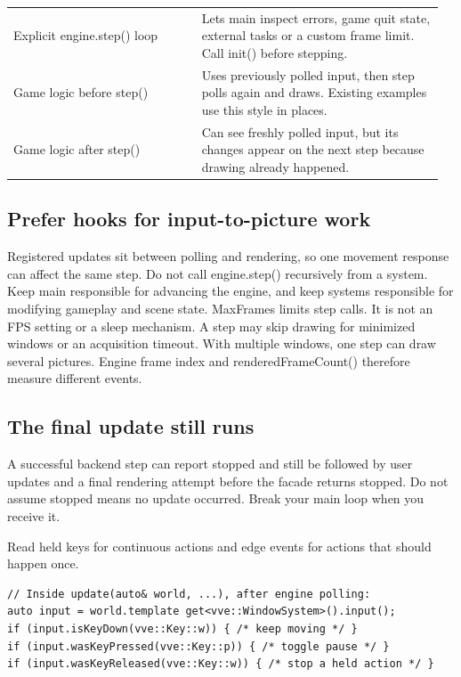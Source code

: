 \documentclass[11pt,a4paper]{article}
\begin{document}
{\small
\begin{longtable}{@{}p{0.42\linewidth}p{0.54\linewidth}@{}}
Explicit engine.step() loop & Lets main inspect errors, game quit state, external tasks or a custom frame limit. Call init() before stepping. \\
Game logic before step() & Uses previously polled input, then step polls again and draws. Existing examples use this style in places. \\
Game logic after step() & Can see freshly polled input, but its changes appear on the next step because drawing already happened. \\
\end{longtable}
}

\subsection*{Prefer hooks for input-to-picture work}
Registered updates sit between polling and rendering, so one movement response can affect the same step. Do not call engine.step() recursively from a system. Keep main responsible for advancing the engine, and keep systems responsible for modifying gameplay and scene state. MaxFrames limits step calls. It is not an FPS setting or a sleep mechanism. A step may skip drawing for minimized windows or an acquisition timeout. With multiple windows, one step can draw several pictures. Engine frame index and renderedFrameCount() therefore measure different events.

\subsection*{The final update still runs}
A successful backend step can report stopped and still be followed by user updates and a final rendering attempt before the facade returns stopped. Do not assume stopped means no update occurred. Break your main loop when you receive it.

\label{core-58}
Read held keys for continuous actions and edge events for actions that should happen once.

\begin{lstlisting}[language={}]
// Inside update(auto& world, ...), after engine polling:
auto input = world.template get<vve::WindowSystem>().input();
if (input.isKeyDown(vve::Key::w)) { /* keep moving */ }
if (input.wasKeyPressed(vve::Key::p)) { /* toggle pause */ }
if (input.wasKeyReleased(vve::Key::w)) { /* stop a held action */ }
\end{lstlisting}
\end{document}

